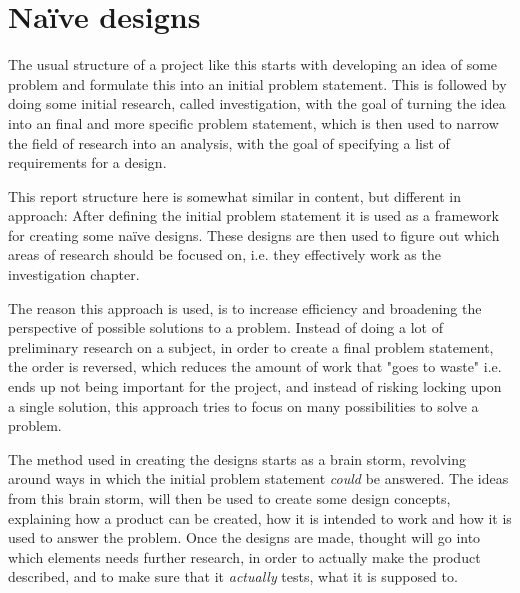 \section{Naïve designs}
The usual structure of a project like this starts with developing an idea of some problem and formulate this into an initial problem statement. This is followed by doing some initial research, called investigation, with the goal of turning the idea into an final and more specific problem statement, which is then used to narrow the field of research into an analysis, with the goal of specifying a list of requirements for a design.

This report structure here is somewhat similar in content, but different in approach:
After defining the initial problem statement it is used as a framework for creating some naïve designs. These designs are then used to figure out which areas of research should be focused on, i.e. they effectively work as the investigation chapter.
\bigskip

The reason this approach is used, is to increase efficiency and broadening the perspective of possible solutions to a problem. Instead of doing a lot of preliminary research on a subject, in order to create a final problem statement, the order is reversed, which reduces the amount of work that "goes to waste" i.e. ends up not being important for the project, and instead of risking locking upon a single solution, this approach tries to focus on many possibilities to solve a problem.
\bigskip

The method used in creating the designs starts as a brain storm, revolving around ways in which the initial problem statement \textit{could} be answered. The ideas from this brain storm, will then be used to create some design concepts, explaining how a product can be created, how it is intended to work and how it is used to answer the problem. Once the designs are made, thought will go into which elements needs further research, in order to actually make the product described, and to make sure that it \textit{actually} tests, what it is supposed to.


